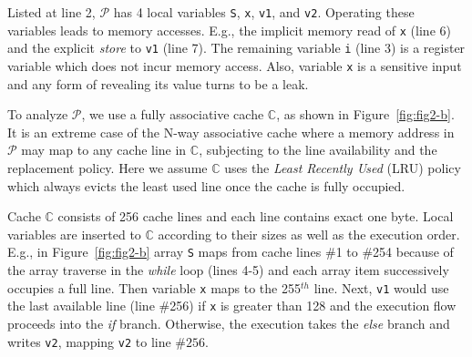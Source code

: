 \documentclass[sigconf]{acmart}
\newcommand{\prog}{\mathcal{P}}
\begin{document}
Listed at line 2, ${\prog}$ has 4 local variables \texttt{S}, \texttt{x}, 
\texttt{v1}, and \texttt{v2}. 
Operating these variables leads to memory accesses. E.g., the implicit 
memory read of \texttt{x} (line 6) and the explicit \emph{store} to 
\texttt{v1} (line 7). The remaining variable \texttt{i} (line 3) is a 
register variable which does not incur memory access. Also, variable 
\texttt{x} is a sensitive input and any form of revealing its value 
turns to be a leak. 


To analyze $\prog$, we use a fully associative cache $\mathbb{C}$, as shown in 
Figure~\ref{fig:fig2-b}. It is an extreme case of the N-way associative cache 
where a memory address in $\prog$ may map to any cache line in $\mathbb{C}$,
subjecting to the line availability and the replacement policy. Here we assume 
$\mathbb{C}$ uses the \emph{Least Recently Used} (LRU) policy which always
evicts the least used line once the cache is fully occupied.


Cache $\mathbb{C}$ consists of 256 cache lines and each line contains exact one byte. 
Local variables are inserted to $\mathbb{C}$ according to their sizes as well as 
the execution order. 
E.g., in Figure~\ref{fig:fig2-b} array \texttt{S} maps from 
cache lines \#1 to \#254 because of the array traverse in the \emph{while} loop 
(lines 4-5) and each array item successively occupies a full line. Then variable 
\texttt{x} maps to the 255$^{\mathit{th}}$ line. Next, \texttt{v1} would use the 
last available line (line \#256) if \texttt{x} is greater than 128 and the execution 
flow proceeds into the \textit{if} branch. Otherwise, the execution takes the 
\textit{else} branch and writes \texttt{v2}, mapping \texttt{v2} to line $\#256$.
\end{document}
